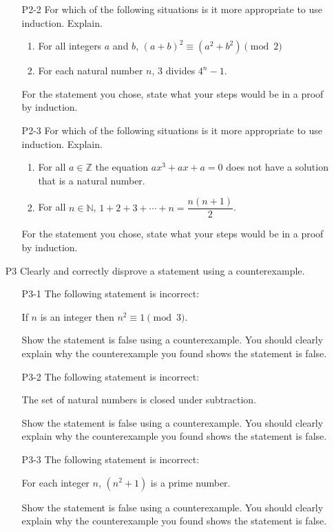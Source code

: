 \documentclass[11pt]{article}
\newcommand{\Z}{\mathbb{Z}}
\newcommand{\N}{\mathbb{N}}
\begin{document}
\begin{itemize}
\begin{enumerate}
	\item[P2-2] For which of the following situations is it more appropriate to use induction. Explain.
		\begin{enumerate}
		\item For all integers $a$ and $b$, $(a+b)^2 \equiv (a^2 +b^2) \pmod{2}$
		\item For each natural number $n$, $3$ divides $4^n-1$.
		\end{enumerate}
	For the statement you chose, state what your steps would be in a proof by induction.

	\item[P2-3] For which of the following situations is it more appropriate to use induction. Explain.
		\begin{enumerate}
		\item For all $a\in\Z$ the equation $ax^3+ax + a = 0$ does not have a solution that is a natural number.
		\item For all $n\in\N$, $1+2+3+\cdots + n = \dfrac{n(n+1)}{2}$.
		\end{enumerate}
	For the statement you chose, state what your steps would be in a proof by induction.
	
\end{enumerate}

\newpage


\item[P3] Clearly and correctly disprove a statement using a counterexample.

	\begin{enumerate}
	\item[P3-1] The following statement is incorrect:
		\begin{center}
		If $n$ is an integer then $n^2\equiv 1\pmod{3}$.
		\end{center}
			Show the statement is false using a counterexample. You should clearly explain why the counterexample you found shows the statement is false.
	
	\item[P3-2] The following statement is incorrect:
		\begin{center}
		The set of natural numbers is closed under subtraction.
		\end{center}
		Show the statement is false using a counterexample. You should clearly explain why the counterexample you found shows the statement is false.
		
		\item[P3-3] The following statement is incorrect:
		\begin{center}
		For each integer $n$, $(n^2+1)$ is a prime number.
		\end{center}
	Show the statement is false using a counterexample. You should clearly explain why the counterexample you found shows the statement is false.
	

\end{enumerate}
\end{itemize}
\end{document}
